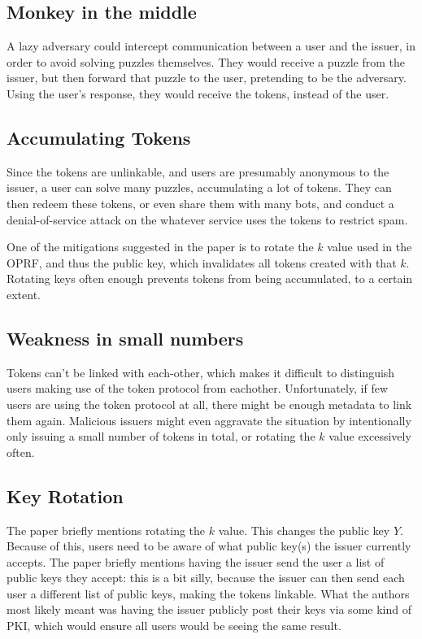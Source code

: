 \documentclass[9pt, a4paper]{article}
\begin{document}
\subsection{Monkey in the middle}

A lazy adversary could intercept communication between a user and
the issuer, in order to avoid solving puzzles themselves. They
would receive a puzzle from the issuer, but then forward that puzzle
to the user, pretending to be the adversary. Using the user's response,
they would receive the tokens, instead of the user.

\subsection{Accumulating Tokens}

Since the tokens are unlinkable,
and users are presumably anonymous to the issuer, a user can solve
many puzzles, accumulating a lot of tokens. They can then redeem
these tokens, or even share them with many bots, and conduct
a denial-of-service attack on the whatever service uses the tokens
to restrict spam.

One of the mitigations suggested in the paper is to rotate the $k$
value used in the OPRF, and thus the public key, which invalidates
all tokens created with that $k$. Rotating keys often enough
prevents tokens from being accumulated, to a certain extent.

\subsection{Weakness in small numbers}

Tokens can't be linked with each-other, which makes it difficult
to distinguish users making use of the token protocol from eachother.
Unfortunately, if few users are using the token protocol at all,
there might be enough metadata to link them again. Malicious issuers
might even aggravate the situation by intentionally only issuing
a small number of tokens in total, or rotating the $k$ value excessively
often.

\subsection{Key Rotation}

The paper briefly mentions rotating the $k$ value. This changes
the public key $Y$. Because of this, users need to be aware of
what public key(s) the issuer currently accepts. The paper briefly
mentions having the issuer send the user a list of public keys they accept:
this is a bit silly, because the issuer can then send each user
a different list of public keys, making the tokens linkable. What the
authors most likely meant was having the issuer publicly post
their keys via some kind of PKI, which would ensure all users would
be seeing the same result.


\footnotesize 
\end{document}
